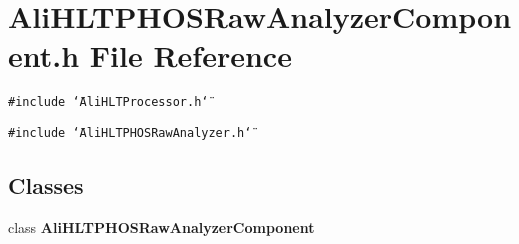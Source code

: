 \section{Ali\-HLTPHOSRaw\-Analyzer\-Component.h File Reference}
\label{AliHLTPHOSRawAnalyzerComponent_8h}
{\tt \#include \char`\"{}Ali\-HLTProcessor.h\char`\"{}}\par
{\tt \#include \char`\"{}Ali\-HLTPHOSRaw\-Analyzer.h\char`\"{}}\par
\subsection*{Classes}
\begin{CompactItemize}
\item 
class {\bf Ali\-HLTPHOSRaw\-Analyzer\-Component}
\end{CompactItemize}
